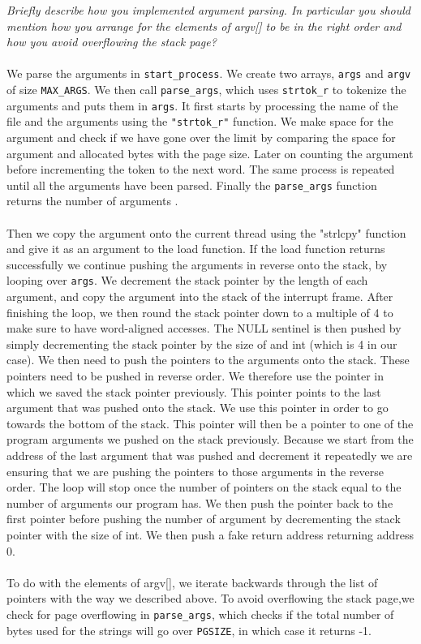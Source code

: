 \documentclass{article}
\begin{document}
\textit{Briefly describe how you implemented argument parsing. In particular you
should mention how you arrange for the elements of argv[] to be in the right
order and how you avoid overflowing the stack page?}
\\ \\
We parse the arguments in \texttt{start\_process}. We create two arrays, \texttt{args} and \texttt{argv} of size \texttt{MAX\_ARGS}. We then call \texttt{parse\_args}, which uses \texttt{strtok\_r} to tokenize the arguments and puts them in \texttt{args}. It first starts by processing the name of the file and the arguments using the \texttt{"strtok\_r"} function. We make space for the argument and check if we have gone over the limit by comparing the space for argument and allocated bytes with the page size. Later on counting the argument before incrementing the token to the next word. The same process is repeated until all the arguments have been parsed. Finally the \texttt{parse\_args} function returns the number of arguments .
\\ \\
Then we copy the argument onto the current thread using the "strlcpy"  function and give it as an argument to the load function. If the load function returns successfully we continue pushing the arguments in reverse onto the stack, by looping over \texttt{args}. We  decrement the stack pointer by the length of each argument, and copy the argument into  the stack of the interrupt frame. After finishing the loop, we then round the stack pointer down to a multiple of 4 to make sure to have word-aligned accesses. The NULL sentinel is then pushed by simply decrementing the stack pointer by the size of and int (which is 4 in our case). We then need to push the pointers to the arguments onto the stack. These pointers need to be pushed in reverse order. We therefore use the pointer in which we saved the stack pointer previously. This pointer points to the last argument that was pushed onto the stack. We use this pointer in order to go towards the bottom of the stack. This pointer will then be a pointer to one of the program arguments we pushed on the stack previously. Because we start from the address of the last argument that was pushed and decrement it repeatedly we are ensuring that we are pushing the pointers to those arguments in the reverse order. The loop will stop once the number of pointers on the stack equal to the number of arguments our program has. We then push the pointer back to the first pointer before pushing the number of argument by decrementing the stack pointer with the size of int. We then push a fake return address returning address 0.
\\ \\
To do with the elements of argv[], we iterate backwards through the list of pointers with the way we described above. To avoid overflowing the stack page,we check for page overflowing in \texttt{parse\_args}, which checks if the total number of bytes used for the strings will go over \texttt{PGSIZE}, in which case it returns -1.
\end{document}

